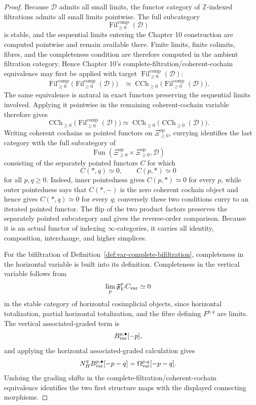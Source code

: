 \begin{proof}
Because \(\mathcal D\) admits all small limits, the functor category of \(\mathbb Z\)-indexed filtrations admits all small limits pointwise. The full subcategory
\[
    \operatorname{Fil}^{\mathrm{comp}}_{\ge0}(\mathcal D)
\]
is stable, and the sequential limits entering the Chapter 10 construction are computed pointwise and remain available there. Finite limits, finite colimits, fibres, and the completeness condition are therefore computed in the ambient filtration category. Hence Chapter 10's complete-filtration/coherent-cochain equivalence may first be applied with target
\(\operatorname{Fil}^{\mathrm{comp}}_{\ge0}(\mathcal D)\):
\[
\begin{aligned}
    \operatorname{Fil}^{\mathrm{comp}}_{\ge0}
    \bigl(
      \operatorname{Fil}^{\mathrm{comp}}_{\ge0}(\mathcal D)
    \bigr)
    &\simeq
    \operatorname{CCh}_{\ge0}
    \bigl(
      \operatorname{Fil}^{\mathrm{comp}}_{\ge0}(\mathcal D)
    \bigr).
\end{aligned}
\]
The same equivalence is natural in exact functors preserving the sequential limits involved. Applying it pointwise in the remaining coherent-cochain variable therefore gives
\[
    \operatorname{CCh}_{\ge0}
    \bigl(
      \operatorname{Fil}^{\mathrm{comp}}_{\ge0}(\mathcal D)
    \bigr)
    \simeq
    \operatorname{CCh}_{\ge0}
    \bigl(
      \operatorname{CCh}_{\ge0}(\mathcal D)
    \bigr).
\]
Writing coherent cochains as pointed functors on
\(\Xi_{\ge0}^{\mathrm{op}}\), currying identifies the last category with the full subcategory of
\[
    \operatorname{Fun}\left(
      \Xi_{\ge0}^{\mathrm{op}}\times\Xi_{\ge0}^{\mathrm{op}},
      \mathcal D
    \right)
\]
consisting of the separately pointed functors \(C\) for which
\[
    C(*,q)\simeq0,
    \qquad
    C(p,*)\simeq0
\]
for all \(p,q\ge0\). Indeed, inner pointedness gives \(C(p,*)\simeq0\) for every \(p\), while outer pointedness says that \(C(*,-)\) is the zero coherent cochain object and hence gives \(C(*,q)\simeq0\) for every \(q\); conversely these two conditions curry to an iterated pointed functor. The flip of the two product factors preserves the separately pointed subcategory and gives the reverse-order comparison. Because it is an actual functor of indexing \(\infty\)-categories, it carries all identity, composition, interchange, and higher simplices.

For the bifiltration of Definition~\ref{def:var-complete-bifiltration}, completeness in the horizontal variable is built into its definition. Completeness in the vertical variable follows from
\[
    \lim_p\mathfrak F_V^pC_{\mathrm{var}}\simeq0
\]
in the stable category of horizontal cosimplicial objects, since horizontal totalization, partial horizontal totalization, and the fibre defining \(F^{p,q}\) are limits. The vertical associated-graded term is
\[
    B_{\mathrm{var}}^{p,\bullet}[-p],
\]
and applying the horizontal associated-graded calculation gives
\[
    N_H^qB_{\mathrm{var}}^{p,\bullet}[-p-q]
    =
    \Omega_{\mathrm{var}}^{p,q}[-p-q].
\]
Undoing the grading shifts in the complete-filtration/coherent-cochain equivalence identifies the two first structure maps with the displayed connecting morphisms.
\end{proof}

